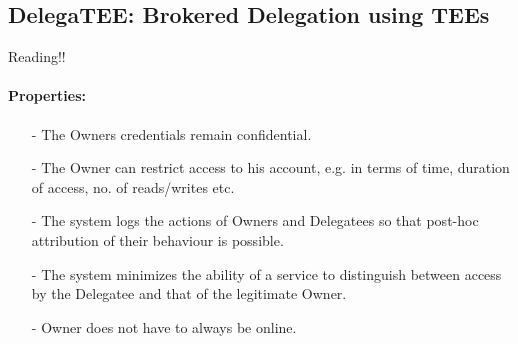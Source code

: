 \subsection{DelegaTEE: Brokered Delegation using TEEs}
Reading!!
\paragraph{Properties: }
\begin{itemize}
    \item[-]The Owners credentials remain confidential.
    \item[-]The Owner can restrict access to his account, e.g. in terms of time, duration of access, no. of reads/writes etc.
    \item[-]The system logs the actions of Owners and Delegatees so that post-hoc attribution of their behaviour is possible.
    \item[-]The system minimizes the ability of a service to distinguish between access by the Delegatee and that of the legitimate Owner.
    \item[-]Owner does not have to always be online.
\end{itemize}


